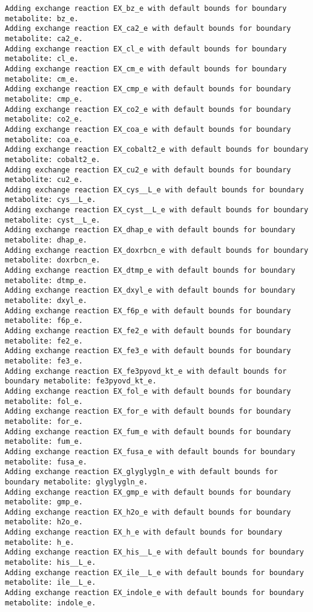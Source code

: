 \documentclass[
  letterpaper,
  DIV=11,
  numbers=noendperiod]{scrartcl}
\begin{document}
\begin{verbatim}
Adding exchange reaction EX_bz_e with default bounds for boundary metabolite: bz_e.
Adding exchange reaction EX_ca2_e with default bounds for boundary metabolite: ca2_e.
Adding exchange reaction EX_cl_e with default bounds for boundary metabolite: cl_e.
Adding exchange reaction EX_cm_e with default bounds for boundary metabolite: cm_e.
Adding exchange reaction EX_cmp_e with default bounds for boundary metabolite: cmp_e.
Adding exchange reaction EX_co2_e with default bounds for boundary metabolite: co2_e.
Adding exchange reaction EX_coa_e with default bounds for boundary metabolite: coa_e.
Adding exchange reaction EX_cobalt2_e with default bounds for boundary metabolite: cobalt2_e.
Adding exchange reaction EX_cu2_e with default bounds for boundary metabolite: cu2_e.
Adding exchange reaction EX_cys__L_e with default bounds for boundary metabolite: cys__L_e.
Adding exchange reaction EX_cyst__L_e with default bounds for boundary metabolite: cyst__L_e.
Adding exchange reaction EX_dhap_e with default bounds for boundary metabolite: dhap_e.
Adding exchange reaction EX_doxrbcn_e with default bounds for boundary metabolite: doxrbcn_e.
Adding exchange reaction EX_dtmp_e with default bounds for boundary metabolite: dtmp_e.
Adding exchange reaction EX_dxyl_e with default bounds for boundary metabolite: dxyl_e.
Adding exchange reaction EX_f6p_e with default bounds for boundary metabolite: f6p_e.
Adding exchange reaction EX_fe2_e with default bounds for boundary metabolite: fe2_e.
Adding exchange reaction EX_fe3_e with default bounds for boundary metabolite: fe3_e.
Adding exchange reaction EX_fe3pyovd_kt_e with default bounds for boundary metabolite: fe3pyovd_kt_e.
Adding exchange reaction EX_fol_e with default bounds for boundary metabolite: fol_e.
Adding exchange reaction EX_for_e with default bounds for boundary metabolite: for_e.
Adding exchange reaction EX_fum_e with default bounds for boundary metabolite: fum_e.
Adding exchange reaction EX_fusa_e with default bounds for boundary metabolite: fusa_e.
Adding exchange reaction EX_glyglygln_e with default bounds for boundary metabolite: glyglygln_e.
Adding exchange reaction EX_gmp_e with default bounds for boundary metabolite: gmp_e.
Adding exchange reaction EX_h2o_e with default bounds for boundary metabolite: h2o_e.
Adding exchange reaction EX_h_e with default bounds for boundary metabolite: h_e.
Adding exchange reaction EX_his__L_e with default bounds for boundary metabolite: his__L_e.
Adding exchange reaction EX_ile__L_e with default bounds for boundary metabolite: ile__L_e.
Adding exchange reaction EX_indole_e with default bounds for boundary metabolite: indole_e.

\end{verbatim}
\end{document}
